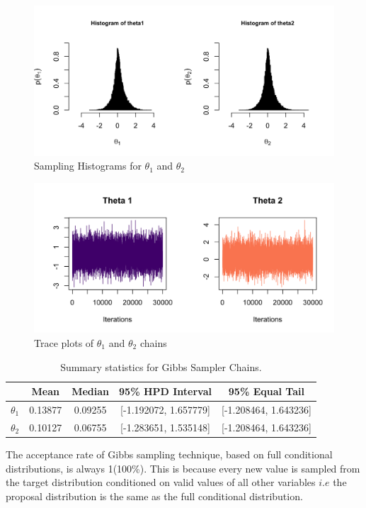 \documentclass[12pt]{article}
\begin{document}
\begin{figure}[h!]
    \centering
    \includegraphics[width=0.6\linewidth]{pictures/fig02-gs-histogram.png}
    \caption{Sampling Histograms for $\theta_1$ and $\theta_2$ }
    \label{fig:gs-histogram}
\end{figure}

\begin{figure}[h!]
    \centering
    \includegraphics[width=0.6\linewidth]{pictures/fig01-gs-traceplot.png}
    \caption{Trace plots of $\theta_1$ and $\theta_2$ chains }
    \label{fig:gs-traceplot}
\end{figure}



\begin{table}[h!]
\centering
\caption{Summary statistics for Gibbs Sampler Chains.}
\begin{tabular}{lcccc}
\toprule
\textbf{} & \textbf{Mean} & \textbf{Median} & \textbf{95\% HPD Interval}  & \textbf{95\% Equal Tail} \\
\midrule
$\theta_1$ & 0.13877 & 0.09255 & [-1.192072, 1.657779] & [-1.208464, 1.643236] \\
$\theta_2$ & 0.10127 & 0.06755 & [-1.283651, 1.535148] & [-1.208464, 1.643236] \\
\bottomrule
\end{tabular}
\label{tab:summary_gs}
\end{table}

The acceptance rate of Gibbs sampling technique, based on full conditional distributions, is always 1(100\%). This is because every new value is sampled from the target distribution conditioned on valid values of all other variables $i.e$ the proposal distribution is the same as the full conditional distribution.
\end{document}
